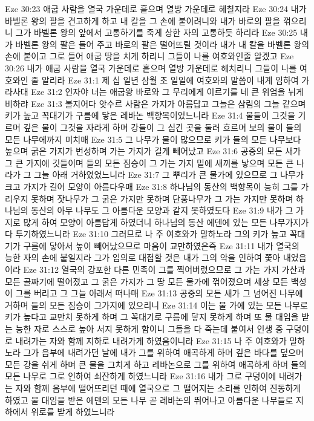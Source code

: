 Eze 30:23  애굽 사람을 열국 가운데로 흩으며 열방 가운데로 헤칠지라
Eze 30:24  내가 바벨론 왕의 팔을 견고하게 하고 내 칼을 그 손에 붙이려니와 내가 바로의 팔을 꺾으리니 그가 바벨론 왕의 앞에서 고통하기를 죽게 상한 자의 고통하듯 하리라
Eze 30:25  내가 바벨론 왕의 팔은 들어 주고 바로의 팔은 떨어뜨릴 것이라 내가 내 칼을 바벨론 왕의 손에 붙이고 그로 들어 애굽 땅을 치게 하리니 그들이 나를 여호와인줄 알겠고
Eze 30:26  내가 애굽 사람을 열국 가운데로 흩으며 열방 가운데로 헤치리니 그들이 나를 여호와인 줄 알리라
Eze 31:1  제 십 일년 삼월 초 일일에 여호와의 말씀이 내게 임하여 가라사대
Eze 31:2  인자야 너는 애굽왕 바로와 그 무리에게 이르기를 네 큰 위엄을 뉘게 비하랴
Eze 31:3  볼지어다 앗수르 사람은 가지가 아름답고 그늘은 삼림의 그늘 같으며 키가 높고 꼭대기가 구름에 닿은 레바논 백향목이었느니라
Eze 31:4  물들이 그것을 기르며 깊은 물이 그것을 자라게 하며 강들이 그 심긴 곳을 둘러 흐르며 보의 물이 들의 모든 나무에까지 미치매
Eze 31:5  그 나무가 물이 많으므로 키가 들의 모든 나무보다 높으며 굵은 가지가 번성하며 가는 가지가 길게 빼어났고
Eze 31:6  공중의 모든 새가 그 큰 가지에 깃들이며 들의 모든 짐승이 그 가는 가지 밑에 새끼를 낳으며 모든 큰 나라가 그 그늘 아래 거하였었느니라
Eze 31:7  그 뿌리가 큰 물가에 있으므로 그 나무가 크고 가지가 길어 모양이 아름다우매
Eze 31:8  하나님의 동산의 백향목이 능히 그를 가리우지 못하며 잣나무가 그 굵은 가지만 못하며 단풍나무가 그 가는 가지만 못하며 하나님의 동산의 아무 나무도 그 아름다운 모양과 같지 못하였도다
Eze 31:9  내가 그 가지로 많게 하여 모양이 아름답게 하였더니 하나님의 동산 에덴에 있는 모든 나무가지가 다 투기하였느니라
Eze 31:10  그러므로 나 주 여호와가 말하노라 그의 키가 높고 꼭대기가 구름에 닿아서 높이 빼어났으므로 마음이 교만하였은즉
Eze 31:11  내가 열국의 능한 자의 손에 붙일지라 그가 임의로 대접할 것은 내가 그의 악을 인하여 쫓아 내었음이라
Eze 31:12  열국의 강포한 다른 민족이 그를 찍어버렸으므로 그 가는 가지 가산과 모든 골짜기에 떨어졌고 그 굵은 가지가 그 땅 모든 물가에 꺾어졌으며 세상 모든 백성이 그를 버리고 그 그늘 아래서 떠나매
Eze 31:13  공중의 모든 새가 그 넘어진 나무에 거하며 들의 모든 짐승이 그가지에 있으리니
Eze 31:14  이는 물 가에 있는 모든 나무로 키가 높다고 교만치 못하게 하며 그 꼭대기로 구름에 닿지 못하게 하며 또 물 대임을 받는 능한 자로 스스로 높아 서지 못하게 함이니 그들을 다 죽는데 붙여서 인생 중 구덩이로 내려가는 자와 함께 지하로 내려가게 하였음이니라
Eze 31:15  나 주 여호와가 말하노라 그가 음부에 내려가던 날에 내가 그를 위하여 애곡하게 하며 깊은 바다를 덮으며 모든 강을 쉬게 하며 큰 물을 그치게 하고 레바논으로 그를 위하여 애곡하게 하며 들의 모든 나무로 그로 인하여 쇠잔하게 하였느니라
Eze 31:16  내가 그로 구덩이에 내려가는 자와 함께 음부에 떨어뜨리던 때에 열국으로 그 떨어지는 소리를 인하여 진동하게 하였고 물 대임을 받은 에덴의 모든 나무 곧 레바논의 뛰어나고 아름다운 나무들로 지하에서 위로를 받게 하였느니라
